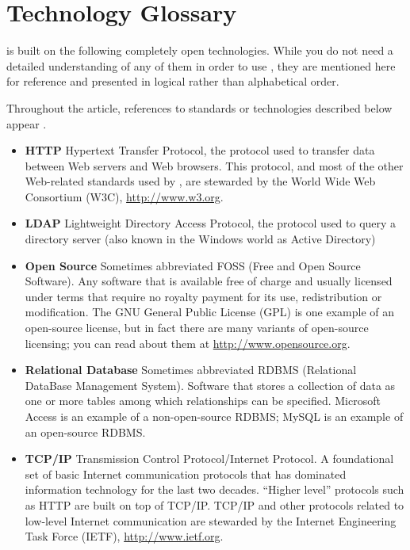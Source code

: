 \section{Technology Glossary}
\label{sec:glossary}

\mtc{} is built on the following completely open technologies.  While
you do not need a detailed understanding of any of them in order to use
\mtc{}, they are mentioned here for reference and presented in logical
rather than alphabetical order.

Throughout the article, references to standards or
technologies described below appear .

\begin{itemize}
\item \textbf{HTTP} Hypertext Transfer Protocol, the protocol used to transfer 
  data between Web servers and Web browsers.  This protocol, and most of
  the other Web-related standards used 
  by \mtc, are stewarded by the World Wide Web Consortium 
  (W3C), \url{http://www.w3.org}.
\item \textbf{LDAP} Lightweight Directory Access Protocol, the protocol used to
  query a directory server (also known in the Windows world as Active Directory)
\item \textbf{Open Source} Sometimes abbreviated FOSS (Free and Open Source
  Software).  Any software that is available free of charge and
  usually licensed under terms that require no royalty payment for its
  use, redistribution or modification.  The GNU General Public License
  (GPL) is one example of an open-source license, but in fact there are
  many variants of open-source licensing; you can read about them at
  \url{http://www.opensource.org}. 
\item \textbf{Relational Database} Sometimes abbreviated RDBMS (Relational
  DataBase Management System).  Software that stores a collection of
  data as one or more tables among which
  relationships can be specified.  Microsoft Access is an example of a
  non-open-source RDBMS; MySQL is an example of an open-source RDBMS.
\item \textbf{TCP/IP} Transmission Control Protocol/Internet Protocol.  A
  foundational set of basic Internet communication protocols that has
  dominated information technology for the last two decades.  ``Higher
  level'' protocols such as HTTP are built on top of TCP/IP.  TCP/IP and
  other protocols related to low-level Internet communication 
  are stewarded by the
  Internet Engineering Task Force (IETF), \url{http://www.ietf.org}.

\end{itemize}
